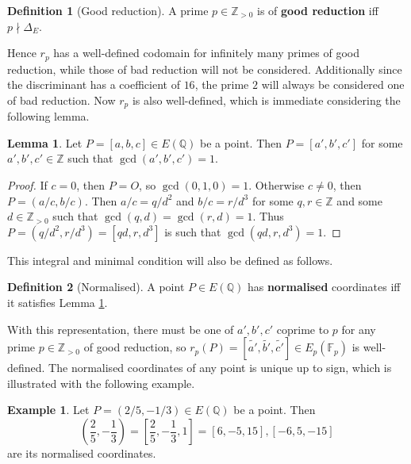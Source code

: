 \documentclass{article}
\newcommand{\F}{\mathbb{F}}
\newcommand{\Z}{\mathbb{Z}}
\newcommand{\Q}{\mathbb{Q}}
\newcommand{\rb}[1]{\left( #1 \right)}
\renewcommand{\sb}[1]{\left[ #1 \right]}
\theoremstyle{definition}\newtheorem*{definition}{Definition}
\theoremstyle{definition}\newtheorem*{example}{Example}
\theoremstyle{definition}\newtheorem*{remark}{Remark}
\newtheorem{lemma}[proposition]{Lemma}
\begin{document}
\begin{definition}[Good reduction]
A prime $ p \in \Z_{> 0} $ is of \textbf{good reduction} iff $ p \nmid \Delta_E $.
\end{definition}

Hence $ r_p $ has a well-defined codomain for infinitely many primes of good reduction, while those of bad reduction will not be considered. Additionally since the discriminant has a coefficient of $ 16 $, the prime $ 2 $ will always be considered one of bad reduction. Now $ r_p $ is also well-defined, which is immediate considering the following lemma.

\begin{lemma}
\label{lem:normalise}
Let $ P = \sb{a, b, c} \in E\rb{\Q} $ be a point. Then $ P = \sb{a', b', c'} $ for some $ a', b', c' \in \Z $ such that $ \gcd\rb{a', b', c'} = 1 $.
\end{lemma}

\begin{proof}
If $ c = 0 $, then $ P = O $, so $ \gcd\rb{0, 1, 0} = 1 $. Otherwise $ c \ne 0 $, then $ P = \rb{a / c, b / c} $. Then $ a / c = q / d^2 $ and $ b / c = r / d^3 $ for some $ q, r \in \Z $ and some $ d \in \Z_{> 0} $ such that $ \gcd\rb{q, d} = \gcd\rb{r, d} = 1 $. Thus $ P = \rb{q / d^2, r / d^3} = \sb{qd, r, d^3} $ is such that $ \gcd\rb{qd, r, d^3} = 1 $.
\end{proof}

This integral and minimal condition will also be defined as follows.

\begin{definition}[Normalised]
A point $ P \in E\rb{\Q} $ has \textbf{normalised} coordinates iff it satisfies Lemma \ref{lem:normalise}.
\end{definition}

With this representation, there must be one of $ a', b', c' $ coprime to $ p $ for any prime $ p \in \Z_{> 0} $ of good reduction, so $ r_p\rb{P} = \sb{\tilde{a'}, \tilde{b'}, \tilde{c'}} \in E_p\rb{\F_p} $ is well-defined. The normalised coordinates of any point is unique up to sign, which is illustrated with the following example.

\begin{example}
Let $ P = \rb{2 / 5, -1 / 3} \in E\rb{\Q} $ be a point. Then
$$ \rb{\dfrac{2}{5}, -\dfrac{1}{3}} = \sb{\dfrac{2}{5}, -\dfrac{1}{3}, 1} = \sb{6, -5, 15}, \sb{-6, 5, -15} $$
are its normalised coordinates.
\end{example}

\pagebreak
\end{document}
